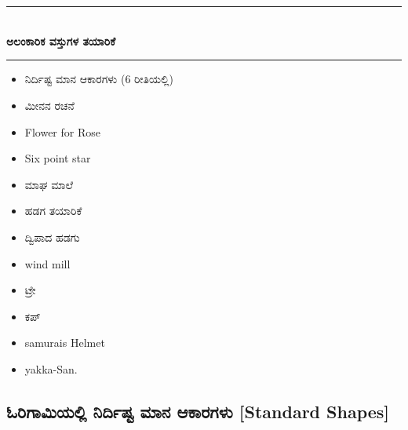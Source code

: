 
\chapter[ಭಾಗ -  2]{}\label{chap2}

\begin{center}
\rule{5cm}{1pt}\\[5pt]
{\Large\bfseries ಅಲಂಕಾರಿಕ ವಸ್ತುಗಳ ತಯಾರಿಕೆ }\\[3pt]
\rule{5cm}{1pt}
\end{center}
 
 \begin{itemize}
 \item ನಿರ್ದಿಷ್ಟ ಮಾನ ಆಕಾರಗಳು (6 ರೀತಿಯಲ್ಲಿ)
 \item  ಮೀನನ ರಚನೆ
 \item Flower for Rose
 \item Six point star
 \item ಮಾಘ ಮಾಲೆ
 \item ಹಡಗ ತಯಾರಿಕೆ
 \item ದ್ವಿಪಾದ ಹಡಗು
 \item wind mill
 \item ಟ್ರೇ
 \item ಕಪ್ 
 \item samurais Helmet
 \item  yakka-San.
  \end{itemize}
 
 \section*{ಓರಿಗಾಮಿಯಲ್ಲಿ ನಿರ್ದಿಷ್ಟ ಮಾನ ಆಕಾರಗಳು [Standard Shapes]}
 
